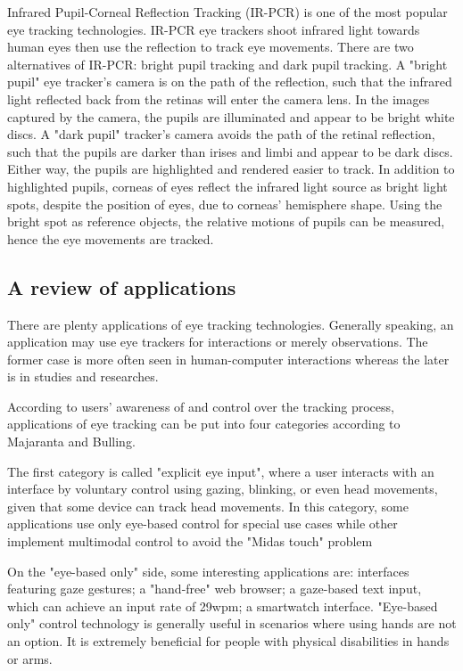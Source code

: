 \documentclass[english]{tktltiki}
\begin{document}
Infrared Pupil-Corneal Reflection Tracking (IR-PCR) is one of the most popular eye tracking technologies. IR-PCR eye trackers shoot infrared light towards human eyes then use the reflection to track eye movements. There are two alternatives of IR-PCR: bright pupil tracking and dark pupil tracking. A "bright pupil" eye tracker's camera is on the path of the reflection, such that the infrared light reflected back from the retinas will enter the camera lens. In the images captured by the camera, the pupils are illuminated and appear to be bright white discs. A "dark pupil" tracker's camera avoids the path of the retinal reflection, such that the pupils are darker than irises and limbi and appear to be dark discs. Either way, the pupils are highlighted and rendered easier to track. In addition to highlighted pupils, corneas of eyes reflect the infrared light source as bright light spots, despite the position of eyes, due to corneas' hemisphere shape. Using the bright spot as reference objects, the relative motions of pupils can be measured, hence the eye movements are tracked.


\subsection{A review of applications}

There are plenty applications of eye tracking technologies. Generally speaking, an application may use eye trackers for interactions or merely observations. The former case is more often seen in human-computer interactions whereas the later is in studies and researches. 

According to users' awareness of and control over the tracking process, applications of eye tracking can be put into four categories according to Majaranta and Bulling.\cite{majaranta14}

The first category is called "explicit eye input", where a user interacts with an interface by voluntary control using gazing, blinking, or even head movements, given that some device can track head movements. In this category, some applications use only eye-based control for special use cases while other implement multimodal control to avoid the "Midas touch" problem \cite{Velichkovsky97}

On the "eye-based only" side, some interesting applications are: interfaces featuring gaze gestures\cite{Drewes:2007:ICU:1778331.1778385}\cite{Ohno:1998:FEG:786112.786297}; a "hand-free" web browser\cite{5090980}; a gaze-based text input\cite{wardmackay2002}, which can achieve an input rate of 29wpm; a smartwatch interface\cite{Hansen:2015:GIT:2800835.2804332}. "Eye-based only" control technology is generally useful in scenarios where using hands are not an option. It is extremely beneficial for people with physical disabilities in hands or arms. 
\end{document}
